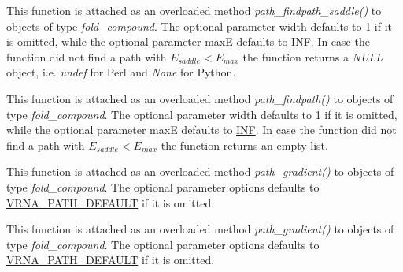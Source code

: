 \begin{DoxyRefList}
\item[\label{wrappers__wrappers000064}%
\Hypertarget{wrappers__wrappers000064}%
Global \hyperlink{group__direct__paths_gada8d722e37401b1aea30128b07555771}{vrna\+\_\+path\+\_\+findpath\+\_\+saddle\+\_\+ub} (vrna\+\_\+fold\+\_\+compound\+\_\+t $\ast$vc, const char $\ast$s1, const char $\ast$s2, int width, int maxE)]This function is attached as an overloaded method {\itshape path\+\_\+findpath\+\_\+saddle()} to objects of type {\itshape fold\+\_\+compound}. The optional parameter {\ttfamily width} defaults to 1 if it is omitted, while the optional parameter {\ttfamily maxE} defaults to \hyperlink{energy__const_8h_a12c2040f25d8e3a7b9e1c2024c618cb6}{I\+NF}. In case the function did not find a path with $E_{saddle} < E_{max}$ the function returns a {\itshape N\+U\+LL} object, i.\+e. {\itshape undef} for Perl and {\itshape None} for Python.  
\item[\label{wrappers__wrappers000066}%
\Hypertarget{wrappers__wrappers000066}%
Global \hyperlink{group__direct__paths_ga8d47812616303f40057dfb033869863a}{vrna\+\_\+path\+\_\+findpath\+\_\+ub} (vrna\+\_\+fold\+\_\+compound\+\_\+t $\ast$vc, const char $\ast$s1, const char $\ast$s2, int width, int maxE)]This function is attached as an overloaded method {\itshape path\+\_\+findpath()} to objects of type {\itshape fold\+\_\+compound}. The optional parameter {\ttfamily width} defaults to 1 if it is omitted, while the optional parameter {\ttfamily maxE} defaults to \hyperlink{energy__const_8h_a12c2040f25d8e3a7b9e1c2024c618cb6}{I\+NF}. In case the function did not find a path with $E_{saddle} < E_{max}$ the function returns an empty list.  
\item[\label{wrappers__wrappers000094}%
\Hypertarget{wrappers__wrappers000094}%
Global \hyperlink{group__paths_gae92cce443a8a64f7b7fb89867b7d6125}{vrna\+\_\+path\+\_\+gradient} (vrna\+\_\+fold\+\_\+compound\+\_\+t $\ast$vc, short $\ast$pt, unsigned int options)]This function is attached as an overloaded method {\itshape path\+\_\+gradient()} to objects of type {\itshape fold\+\_\+compound}. The optional parameter {\ttfamily options} defaults to \hyperlink{group__paths_gaf1bb1f8fec8d24e3b821f621b19f77b4}{V\+R\+N\+A\+\_\+\+P\+A\+T\+H\+\_\+\+D\+E\+F\+A\+U\+LT} if it is omitted.  
\item[\label{wrappers__wrappers000095}%
\Hypertarget{wrappers__wrappers000095}%
Global \hyperlink{group__paths_ga9234756c337078fa599529d3db70d913}{vrna\+\_\+path\+\_\+random} (vrna\+\_\+fold\+\_\+compound\+\_\+t $\ast$vc, short $\ast$pt, unsigned int steps, unsigned int options)]This function is attached as an overloaded method {\itshape path\+\_\+gradient()} to objects of type {\itshape fold\+\_\+compound}. The optional parameter {\ttfamily options} defaults to \hyperlink{group__paths_gaf1bb1f8fec8d24e3b821f621b19f77b4}{V\+R\+N\+A\+\_\+\+P\+A\+T\+H\+\_\+\+D\+E\+F\+A\+U\+LT} if it is omitted.  

\end{DoxyRefList}
